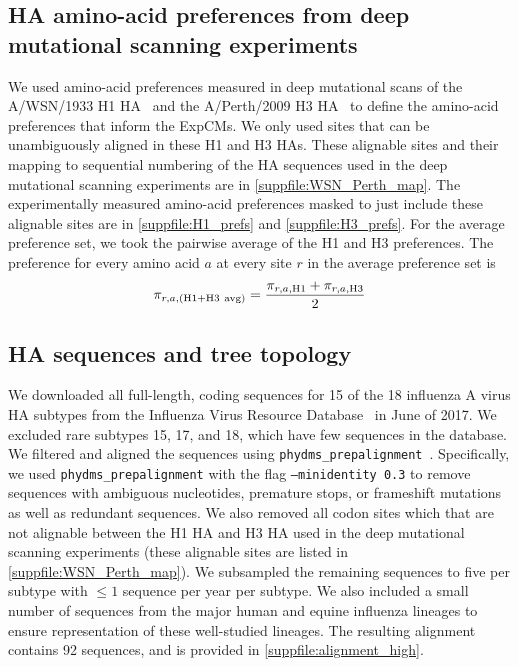\documentclass[11pt]{article}
\begin{document}
\subsection*{HA amino-acid preferences from deep mutational scanning experiments}
We used amino-acid preferences measured in deep mutational scans of the A/WSN/1933 H1 HA~\citep{doud2016accurate} and the A/Perth/2009 H3 HA~\citep{lee2018deep} to define the amino-acid preferences that inform the ExpCMs. 
We only used sites that can be unambiguously aligned in these H1 and H3 HAs. 
These alignable sites and their mapping to sequential numbering of the HA sequences used in the deep mutational scanning experiments are in \ref{suppfile:WSN_Perth_map}. 
The experimentally measured amino-acid preferences masked to just include these alignable sites are in \ref{suppfile:H1_prefs} and \ref{suppfile:H3_prefs}.
For the average preference set, we took the pairwise average of the H1 and H3 preferences. 
The preference for every amino acid $a$ at every site $r$ in the average preference set is
\begin{equation}
\label{eq:pi_avg}
\pi_{r,a,\rm{(H1+H3\ avg)}} = \frac{\pi_{r,a,\rm{H1}} + \pi_{r,a,\rm{H3}}}{2}
\end{equation}

\subsection*{HA sequences and tree topology}

We downloaded all full-length, coding sequences for 15 of the 18 influenza A virus HA subtypes from the Influenza Virus Resource Database~\citep{bao2008influenza} in June of 2017. 
We excluded rare subtypes 15, 17, and 18, which have few sequences in the database.  
We filtered and aligned the sequences using \texttt{phydms\_prepalignment}~\citep{hilton2017phydms}. 
Specifically, we used \texttt{phydms\_prepalignment} with the flag \texttt{--minidentity 0.3} to remove sequences with ambiguous nucleotides, premature stops, or frameshift mutations as well as redundant sequences.  
We also removed all codon sites which that are not alignable between the H1 HA and H3 HA used in the deep mutational scanning experiments (these alignable sites are listed in  \ref{suppfile:WSN_Perth_map}). 
We subsampled the remaining sequences to five per subtype with $\le 1$ sequence per year per subtype. 
We also included a small number of sequences from the major human and equine influenza lineages to ensure representation of these well-studied lineages. 
The resulting alignment contains 92 sequences, and is provided in \ref{suppfile:alignment_high}. 
\end{document}
